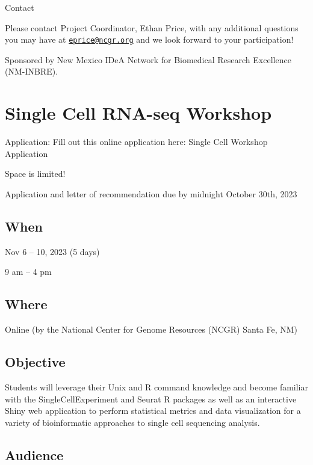\documentclass[
]{book}
\begin{document}
Contact

Please contact Project Coordinator, Ethan Price, with any additional questions you may have at \href{mailto:eprice@ncgr.org}{\nolinkurl{eprice@ncgr.org}} and we look forward to your participation!

Sponsored by New Mexico IDeA Network for Biomedical Research Excellence (NM-INBRE).

\hypertarget{single-cell-rna-seq-workshop}{%
\chapter*{Single Cell RNA-seq Workshop}\label{single-cell-rna-seq-workshop}}

Application: Fill out this online application here: Single Cell Workshop Application

Space is limited!

Application and letter of recommendation due by midnight October 30th, 2023

\hypertarget{when-2}{%
\section*{When}\label{when-2}}

Nov 6 -- 10, 2023 (5 days)

9 am -- 4 pm

\hypertarget{where-1}{%
\section*{Where}\label{where-1}}

Online (by the National Center for Genome Resources (NCGR) Santa Fe, NM)

\hypertarget{objective-1}{%
\section*{Objective}\label{objective-1}}

Students will leverage their Unix and R command knowledge and become familiar with the SingleCellExperiment and Seurat R packages as well as an interactive Shiny web application to perform statistical metrics and data visualization for a variety of bioinformatic approaches to single cell sequencing analysis.

\hypertarget{audience-1}{%
\section*{Audience}\label{audience-1}}
\end{document}
